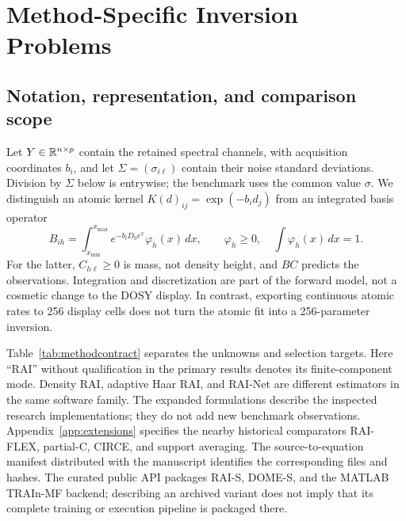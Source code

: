 \section{Method-Specific Inversion Problems}\label{sec:methods}
\subsection{Notation, representation, and comparison scope}
Let $Y\in\mathbb{R}^{n\times p}$ contain the retained spectral channels, with acquisition coordinates $b_i$, and let $\Sigma=(\sigma_{i\ell})$ contain their noise standard deviations. Division by $\Sigma$ below is entrywise; the benchmark uses the common value $\sigma$. We distinguish an atomic kernel $K(d)_{ij}=\exp(-b_i d_j)$ from an integrated basis operator
\begin{equation}\label{eq:integratedbasis}
 B_{ih}=\int_{x_{\min}}^{x_{\max}}e^{-b_iD_0e^x}\varphi_h(x)\,dx,
 \qquad \varphi_h\geq0,\quad \int\varphi_h(x)\,dx=1.
\end{equation}
For the latter, $C_{h\ell}\geq0$ is mass, not density height, and $BC$ predicts the observations. Integration and discretization are part of the forward model, not a cosmetic change to the DOSY display. In contrast, exporting continuous atomic rates to 256 display cells does not turn the atomic fit into a 256-parameter inversion.

Table~\ref{tab:methodcontract} separates the unknowns and selection targets. Here ``RAI'' without qualification in the primary results denotes its finite-component mode. Density RAI, adaptive Haar RAI, and RAI-Net are different estimators in the same software family. The expanded formulations describe the inspected research implementations; they do not add new benchmark observations. Appendix~\ref{app:extensions} specifies the nearby historical comparators RAI-FLEX, partial-C, CIRCE, and support averaging. The source-to-equation manifest distributed with the manuscript identifies the corresponding files and hashes. The curated public API packages RAI-S, DOME-S, and the MATLAB TRAIn-MF backend; describing an archived variant does not imply that its complete training or execution pipeline is packaged there.


